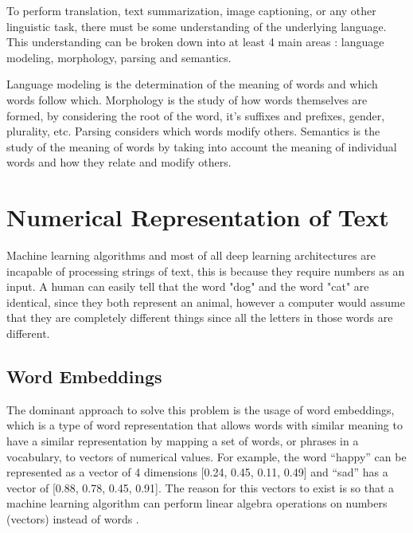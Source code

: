 To perform translation, text summarization, image captioning, or any other linguistic task, there must be some understanding of the underlying language. This understanding can be broken down into at least 4 main areas : language modeling, morphology, parsing and  semantics. \par 

Language modeling is the determination of the meaning of words and which words follow which. Morphology is the study of how words themselves are formed, by considering the root of the word, it's suffixes and prefixes, gender, plurality, etc. Parsing considers which words modify others. Semantics is the study of the meaning of words by taking into account the meaning of individual words and how they relate and modify others. \cite{Otter2018} \par 



\section{Numerical Representation of Text}


\par Machine learning algorithms and most of all deep learning architectures are incapable of processing strings of text, this is because they require numbers as an input. \cite{Vidhya2017} A human can easily tell that the word "dog" and the word "cat" are identical, since they both represent an animal, however a computer would assume that they are completely different things since all the letters in those  words are different. 

    \subsection{Word Embeddings}

    \par The dominant approach to solve this problem is the usage of word embeddings, which is a type of word representation that allows words with similar meaning to have a similar representation by mapping a set of words, or phrases in a vocabulary, to vectors of numerical values. For example, the word “happy” can be represented as a vector of 4 dimensions [0.24, 0.45, 0.11, 0.49] and “sad” has a vector of [0.88, 0.78, 0.45, 0.91]. The reason for this vectors to exist is so that a machine learning algorithm can perform linear algebra operations on numbers (vectors) instead of words \cite{MuratMustafa}.

